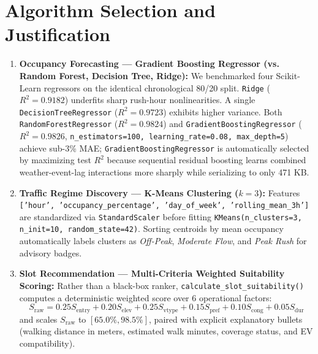 \documentclass[12pt,a4paper,oneside]{report}
\begin{document}
\section{Algorithm Selection and Justification}
\begin{enumerate}[leftmargin=*]
  \item \textbf{Occupancy Forecasting --- Gradient Boosting Regressor (vs. Random Forest, Decision Tree, Ridge):}
  We benchmarked four Scikit-Learn regressors on the identical chronological 80/20 split. \texttt{Ridge} ($R^2 = 0.9182$) underfits sharp rush-hour nonlinearities. A single \texttt{DecisionTreeRegressor} ($R^2 = 0.9723$) exhibits higher variance. Both \texttt{RandomForestRegressor} ($R^2 = 0.9824$) and \texttt{GradientBoostingRegressor} ($R^2 = 0.9826$, \texttt{n_estimators=100, learning_rate=0.08, max_depth=5}) achieve sub-3\% MAE; \texttt{GradientBoostingRegressor} is automatically selected by maximizing test $R^2$ because sequential residual boosting learns combined weather-event-lag interactions more sharply while serializing to only 471 KB.
  \item \textbf{Traffic Regime Discovery --- K-Means Clustering ($k=3$):}
  Features \texttt{['hour', 'occupancy\_percentage', 'day\_of\_week', 'rolling\_mean\_3h']} are standardized via \texttt{StandardScaler} before fitting \texttt{KMeans(n\_clusters=3, n\_init=10, random\_state=42)}. Sorting centroids by mean occupancy automatically labels clusters as \textit{Off-Peak}, \textit{Moderate Flow}, and \textit{Peak Rush} for advisory badges.
  \item \textbf{Slot Recommendation --- Multi-Criteria Weighted Suitability Scoring:}
  Rather than a black-box ranker, \texttt{calculate\_slot\_suitability()} computes a deterministic weighted score over 6 operational factors:
  \[
    S_{\text{raw}} = 0.25 S_{\text{entry}} + 0.20 S_{\text{elev}} + 0.25 S_{\text{vtype}} + 0.15 S_{\text{pref}} + 0.10 S_{\text{cong}} + 0.05 S_{\text{dur}}
  \]
  and scales $S_{\text{raw}}$ to $[65.0\%, 98.5\%]$, paired with explicit explanatory bullets (walking distance in meters, estimated walk minutes, coverage status, and EV compatibility).
\end{enumerate}
\end{document}
